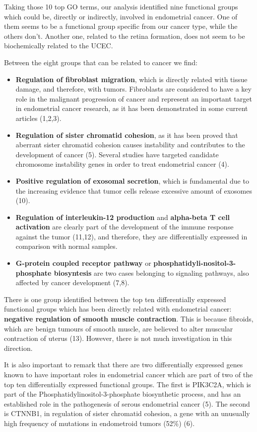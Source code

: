 \documentclass[9pt,twocolumn,twoside]{gsajnl}
\begin{document}
Taking those 10 top GO terms, our analysis identified nine functional groups which could be, directly or indirectly, involved in endometrial cancer. One of them seems to be a functional group specific from our cancer type, while the others don't. Another one, related to the retina formation, does not seem to be biochemically related to the UCEC. 

Between the eight groups that can be related to cancer we find:
\begin{itemize}
  \item \textbf{Regulation of fibroblast migration}, which is directly related with tissue damage, and therefore, with tumors. Fibroblasts are considered to have a key role in the malignant progression of cancer and represent an important target in endometrial cancer research, as it has been demonstrated in some current articles (1,2,3).
  \item \textbf{Regulation of sister chromatid cohesion}, as it has been proved that aberrant sister chromatid cohesion causes instability and contributes to the development of cancer (5). Several studies have targeted candidate chromosome instability genes in order to treat endometrial cancer (4).
  \item \textbf{Positive regulation of exosomal secretion}, which is fundamental due to the increasing evidence that tumor cells release excessive amount of exosomes (10).
  \item \textbf{Regulation of interleukin-12 production} and \textbf{alpha-beta T cell activation} are clearly part of the development of the immune response against the tumor (11,12), and therefore, they are differentially expressed in comparison with normal samples. 
  \item \textbf{G-protein coupled receptor pathway} or \textbf{phosphatidyli-nositol-3-phosphate biosyntesis} are two cases belonging to signaling pathways, also affected by cancer development (7,8).
\end{itemize}

There is one group identified between the top ten differentially expressed functional groups which has been directly related with endometrial cancer: \textbf{negative regulation of smooth muscle contraction}. This is because fibroids, which are benign tumours of smooth muscle, are believed to alter muscular contraction of uterus (13). However, there is not much investigation in this direction.

It is also important to remark that there are two differentially expressed genes known to have important roles in endometrial cancer which are part of two of the top ten differentially expressed functional groups. The first is PIK3C2A, which is part of the Phosphatidylinositol-3-phosphate biosynthetic process, and has an established role in the pathogenesis of serous endometrial cancer (5). The second is CTNNB1, in regulation of sister chromatid cohesion, a gene with an unusually high frequency of mutations in endometroid tumors (52\%) (6). \\
\end{document}
